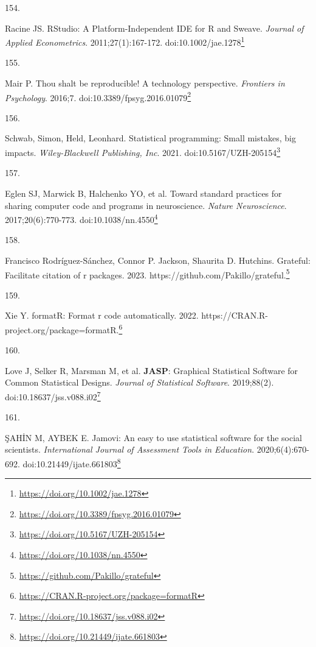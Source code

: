 \documentclass[
]{book}
\newlength{\cslhangindent}
\newlength{\csllabelwidth}
\newlength{\cslentryspacingunit} %
\newenvironment{CSLReferences}[2] %
 {%
  \setlength{\parindent}{0pt}
  \ifodd #1
  \let\oldpar\par
  \def\par{\hangindent=\cslhangindent\oldpar}
  \fi
  \setlength{\parskip}{#2\cslentryspacingunit}
 }%
 {}
\newcommand{\CSLLeftMargin}[1]{\parbox[t]{\csllabelwidth}{#1}}
\newcommand{\CSLRightInline}[1]{\parbox[t]{\linewidth - \csllabelwidth}{#1}\break}
\renewcommand{\href}[2]{#2\footnote{\url{#1}}}
\begin{document}
\begin{CSLReferences}{0}{0}
\leavevmode{}%
\CSLLeftMargin{154. }%
\CSLRightInline{Racine JS. RStudio: A Platform{-}Independent IDE for R and Sweave. \emph{Journal of Applied Econometrics}. 2011;27(1):167-172. doi:\href{https://doi.org/10.1002/jae.1278}{10.1002/jae.1278}}

\leavevmode{}%
\CSLLeftMargin{155. }%
\CSLRightInline{Mair P. Thou shalt be reproducible! A technology perspective. \emph{Frontiers in Psychology}. 2016;7. doi:\href{https://doi.org/10.3389/fpsyg.2016.01079}{10.3389/fpsyg.2016.01079}}

\leavevmode{}%
\CSLLeftMargin{156. }%
\CSLRightInline{Schwab, Simon, Held, Leonhard. Statistical programming: Small mistakes, big impacts. \emph{Wiley-Blackwell Publishing, Inc}. 2021. doi:\href{https://doi.org/10.5167/UZH-205154}{10.5167/UZH-205154}}

\leavevmode{}%
\CSLLeftMargin{157. }%
\CSLRightInline{Eglen SJ, Marwick B, Halchenko YO, et al. Toward standard practices for sharing computer code and programs in neuroscience. \emph{Nature Neuroscience}. 2017;20(6):770-773. doi:\href{https://doi.org/10.1038/nn.4550}{10.1038/nn.4550}}

\leavevmode{}%
\CSLLeftMargin{158. }%
\CSLRightInline{Francisco Rodríguez-Sánchez, Connor P. Jackson, Shaurita D. Hutchins. Grateful: Facilitate citation of r packages. 2023. \href{https://github.com/Pakillo/grateful}{https://github.com/Pakillo/grateful.}}

\leavevmode{}%
\CSLLeftMargin{159. }%
\CSLRightInline{Xie Y. formatR: Format r code automatically. 2022. \href{https://CRAN.R-project.org/package=formatR}{https://CRAN.R-project.org/package=formatR.}}

\leavevmode{}%
\CSLLeftMargin{160. }%
\CSLRightInline{Love J, Selker R, Marsman M, et al. {\textbf{JASP}}: Graphical Statistical Software for Common Statistical Designs. \emph{Journal of Statistical Software}. 2019;88(2). doi:\href{https://doi.org/10.18637/jss.v088.i02}{10.18637/jss.v088.i02}}

\leavevmode{}%
\CSLLeftMargin{161. }%
\CSLRightInline{ŞAHİN M, AYBEK E. Jamovi: An easy to use statistical software for the social scientists. \emph{International Journal of Assessment Tools in Education}. 2020;6(4):670-692. doi:\href{https://doi.org/10.21449/ijate.661803}{10.21449/ijate.661803}}


\end{CSLReferences}
\end{document}
